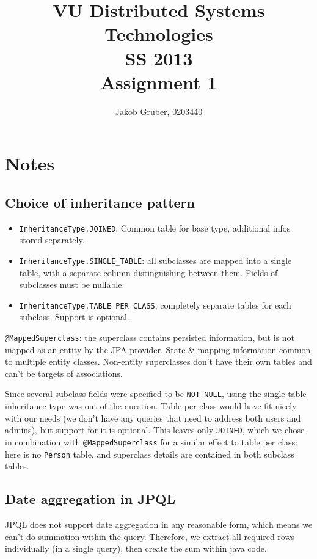 \documentclass[a4paper,10pt]{article}
\title{VU Distributed Systems Technologies \\
       SS 2013 \\
       Assignment 1}
\author{Jakob Gruber, 0203440}
\begin{document}
\maketitle

\section{Notes}

\subsection{Choice of inheritance pattern}

\begin{itemize}
\item \lstinline|InheritanceType.JOINED|; Common table for base type, additional infos stored 
      separately. 
\item \lstinline|InheritanceType.SINGLE_TABLE|: all subclasses are mapped into a single table, with a
      separate column distinguishing between them. Fields of subclasses must be nullable.
\item \lstinline|InheritanceType.TABLE_PER_CLASS|; completely separate tables for each subclass. Support
      is optional.
\end{itemize}

\lstinline|@MappedSuperclass|: the superclass contains persisted information, but is not
mapped as an entity by the JPA provider. State \& mapping information common to
multiple entity classes. Non-entity superclasses don't have their own tables and can't be targets of
associations.

Since several subclass fields were specified to be \lstinline|NOT NULL|, using the single
table inheritance type was out of the question. Table per class would have fit nicely
with our needs (we don't have any queries that need to address both users and admins),
but support for it is optional. This leaves only \lstinline|JOINED|, which we chose in combination with
\lstinline|@MappedSuperclass| for a similar effect to table per class: here is no \lstinline|Person| table,
and superclass details are contained in both subclass tables.

\subsection{Date aggregation in JPQL}

JPQL does not support date aggregation in any reasonable form, which means we
can't do summation within the query. Therefore, we extract all required rows individually
(in a single query), then create the sum within java code.
\end{document}
